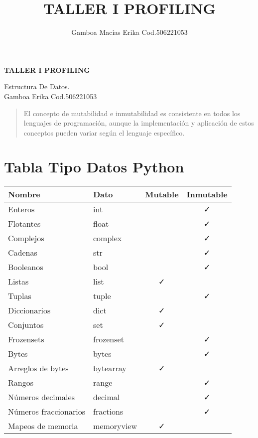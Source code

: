 \documentclass{article}
\title{\huge\textbf{TALLER I PROFILING}}
\author{Gamboa Macias Erika  Cod.506221053}
\date{}
\begin{document}
\begin{titlepage}
\centering
\vspace*{\fill}
{\Huge\textbf{TALLER I PROFILING}}
\vspace{2em}

{\large Estructura De Datos.}\\
{\large Gamboa Erika  Cod.506221053}
\vspace*{\fill}
\end{titlepage}

\begin{quote}
El concepto de mutabilidad e inmutabilidad es consistente en todos los lenguajes de programación, aunque la implementación y aplicación de estos conceptos pueden variar según el lenguaje específico.
\end{quote}
\section{Tabla Tipo Datos Python}
\begin{table}[htbp]
    \centering
    \begin{tabular}{|p{4cm}|p{3cm}|c|c|}
    \hline
    \textbf{Nombre} & \textbf{Dato} & \textbf{Mutable} & \textbf{Inmutable} \\
    \hline
    Enteros & int &  & \faCheck \\
    Flotantes & float &  & \faCheck \\
    Complejos  & complex & & \faCheck \\
    Cadenas  & str &  & \faCheck \\
    Booleanos  & bool &  & \faCheck \\
    Listas  & list & \faCheck & \\
    Tuplas  & tuple &  & \faCheck\\
    Diccionarios  & dict & \faCheck & \\
    Conjuntos & set & \faCheck & \\
    Frozensets  & frozenset &  & \faCheck\\
    Bytes & bytes &  & \faCheck\\
    Arreglos de bytes  & bytearray &\faCheck & \\
    Rangos  & range &  & \faCheck \\
    Números decimales  & decimal &  & \faCheck\\
    Números fraccionarios  & fractions &  & \faCheck\\
    Mapeos de memoria & memoryview & \faCheck & \\
    \hline
    \end{tabular}
    \label{tab:ejemplo}
\end{table}
\end{document}
